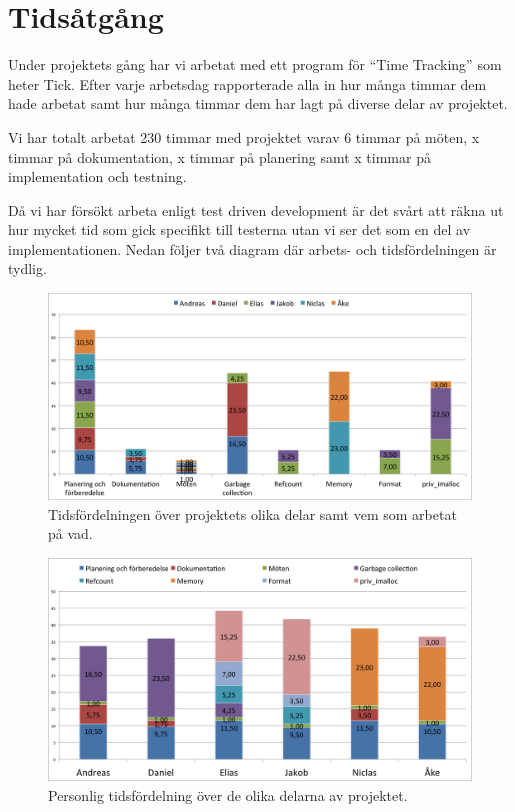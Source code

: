 \documentclass{article}
\begin{document}
\section{Tidsåtgång}

Under projektets gång har vi arbetat med ett program för “Time Tracking” som heter Tick. Efter varje arbetsdag rapporterade alla in hur många timmar dem hade arbetat samt hur många timmar dem har lagt på diverse delar av projektet.

Vi har totalt arbetat 230 timmar med projektet varav 6 timmar på möten, x timmar på dokumentation, x timmar på planering samt x timmar på implementation och testning.

Då vi har försökt arbeta enligt test driven development är det svårt att räkna ut hur mycket tid som gick specifikt till testerna utan vi ser det som en del av implementationen. Nedan följer två diagram där arbets- och tidsfördelningen är tydlig.

\begin{figure}[H]
  \includegraphics[width=\columnwidth]{images/chart_parts.png}
  \caption{Tidsfördelningen över projektets olika delar 
    samt vem som arbetat på vad.}
  \label{fig:chart_parts}
\end{figure}

\begin{figure}[H]
  \includegraphics[width=\columnwidth]{images/chart_people.png}
  \caption{Personlig tidsfördelning över de olika delarna av projektet.}
  \label{fig:chart_people}
\end{figure}
\end{document}
